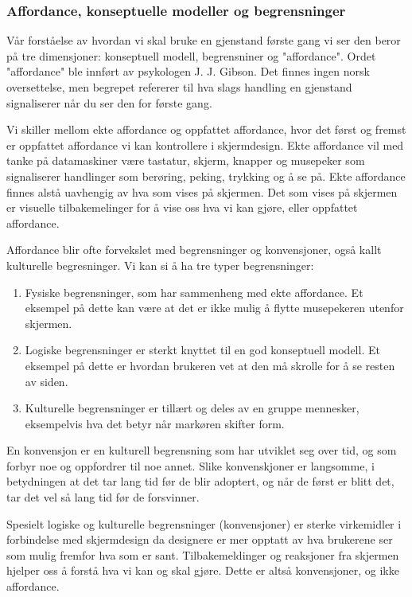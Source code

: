 \subsubsection{Affordance, konseptuelle modeller og begrensninger}
Vår forståelse av hvordan vi skal bruke en gjenstand første gang vi ser den beror på tre dimensjoner: konseptuell modell, begrensniner og "affordance". Ordet "affordance" ble innført av psykologen J. J. Gibson. Det finnes ingen norsk oversettelse, men begrepet refererer til hva slags handling en gjenstand signaliserer når du ser den for første gang.\cite{Norman99}

\noindent
Vi skiller mellom ekte affordance og oppfattet affordance, hvor det først og fremst er oppfattet affordance vi kan kontrollere i skjermdesign. Ekte affordance vil med tanke på datamaskiner være tastatur, skjerm, knapper og musepeker som signaliserer handlinger som berøring, peking, trykking og å se på. Ekte affordance finnes alstå uavhengig av hva som vises på skjermen. Det som vises på skjermen er visuelle tilbakemelinger for å vise oss hva vi kan gjøre, eller oppfattet affordance.\cite{Norman99}

\noindent
Affordance blir ofte forvekslet med begrensninger og konvensjoner, også kallt kulturelle begresninger. Vi kan si å ha tre typer begrensninger:
\begin{enumerate}
\item Fysiske begrensninger, som har sammenheng med ekte affordance. Et eksempel på dette kan være at det er ikke mulig å flytte musepekeren utenfor skjermen. 
\item Logiske begrensninger er sterkt knyttet til en god konseptuell modell. Et eksempel på dette er hvordan brukeren vet at den må skrolle for å se resten av siden.
\item Kulturelle begrensninger er tillært og deles av en gruppe mennesker, eksempelvis hva det betyr når markøren skifter form.
\end{enumerate}
En konvensjon er en kulturell begrensning som har utviklet seg over tid, og som forbyr noe og oppfordrer til noe annet. Slike konvenskjoner er langsomme, i betydningen at det tar lang tid før de blir adoptert, og når de først er blitt det, tar det vel så lang tid før de forsvinner. \cite{Norman99}

\noindent
Spesielt logiske og kulturelle begrensninger (konvensjoner) er sterke virkemidler i forbindelse med skjermdesign da designere er mer opptatt av hva brukerene ser som mulig fremfor hva som er sant. Tilbakemeldinger og reaksjoner fra skjermen hjelper oss å forstå hva vi kan og skal gjøre. Dette er altså konvensjoner, og ikke affordance.\cite{Norman99}